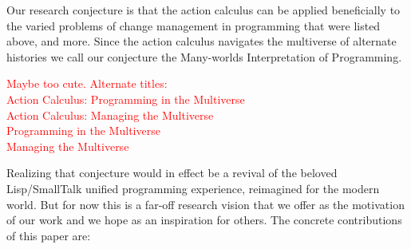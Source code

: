 \documentclass[english,submission]{programming}
\theoremstyle{definition}
\begin{document}
Our research conjecture is that the action calculus can be applied beneficially to the varied problems of change management in programming that were listed above, and more. Since the action calculus navigates the multiverse of alternate histories we call our conjecture the Many-worlds Interpretation of Programming.

\noindent\textcolor{red}{Maybe too cute. Alternate titles:\\
Action Calculus: Programming in the Multiverse\\
Action Calculus: Managing the Multiverse\\
Programming in the Multiverse\\
Managing the Multiverse\\
}

Realizing that conjecture would in effect be a revival of the beloved Lisp/SmallTalk unified programming experience, reimagined for the modern world. But for now this is a far-off research vision that we offer
as the motivation of our work and we hope as an inspiration for others. The concrete contributions of this paper are:
\end{document}
